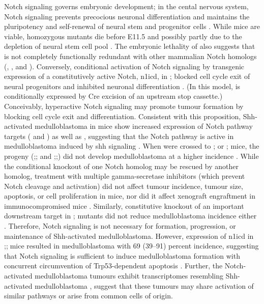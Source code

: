 Notch signaling  governs embryonic development; in the cental nervous system, Notch signaling prevents precocious neuronal differentiation and maintains the pluripotency and self-renewal of neural stem and progenitor cells . While \high{+/-} mice are viable, homozygous  mutants die before E11.5 and possibly partly due to the depletion of neural stem cell pool . The embryonic lethality of \high{-/-} also suggests that  is not completely functionally redundant with other mammalian Notch homologs (, , and ). Conversely, conditional activation of Notch signaling by transgenic expression of a constitutively active Notch, \gls{n1icd}, in ; blocked cell cycle exit of neural progenitors and inhibited neuronal differentiation . (In this model,  is conditionally expressed by Cre excision of an upstream stop cassette.) Conceivably, hyperactive Notch signaling may promote tumour formation by blocking cell cycle exit and differentiation. Consistent with this proposition, Shh-activated medulloblastoma in  mice show increased expression of Notch pathway targets ( and ) as well as , suggesting that the Notch pathway is active in medulloblastoma induced by \gls{shh} signaling . When  were crossed to ; or ; mice, the progeny (;; and ;;) did not develop medulloblastoma at a higher incidence . While the conditional knockout of one Notch homolog may be rescued by another homolog, treatment with multiple gamma-secretase inhibitors (which prevent Notch cleavage and activation) did not affect tumour incidence, tumour size, apoptosis, or cell proliferation in  mice, nor did it affect xenograft engraftment in immunocompromised mice . Similarly, constitutive knockout of an important downstream target  in ;\high{-/-} mutants did not reduce medulloblastoma incidence either . Therefore, Notch signaling is not necessary for formation, progression, or maintenance of Shh-activated medulloblastoma. However, expression of \gls{n1icd} in ;;\high{-/-}mice resulted in medulloblastoma with 69 (39--91) percent incidence, suggesting that Notch signaling is sufficient to induce medulloblastoma formation with concurrent circumvention of Trp53-dependent apoptosis . Further, the Notch-activated medulloblastoma tumours exhibit transcriptomes resembling Shh-activated medulloblastoma , suggest that these tumours may share activation of similar pathways or arise from common cells of origin.

